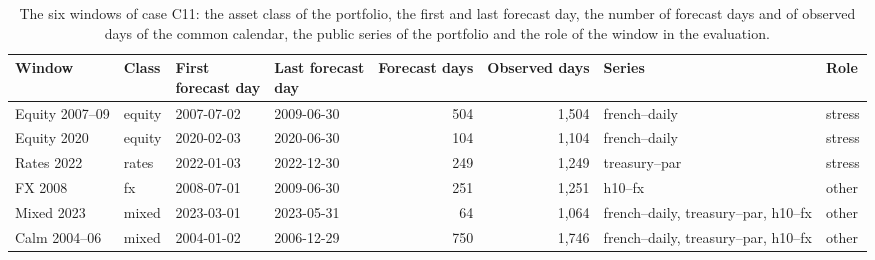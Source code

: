 \begin{table}[htbp]
\centering
\small
\caption{The six windows of case C11: the asset class of the portfolio, the first and last forecast day, the number of forecast days and of observed days of the common calendar, the public series of the portfolio and the role of the window in the evaluation.}
\label{tab:windows}
{\footnotesize\setlength{\tabcolsep}{4pt}
\begin{adjustbox}{max width=\textwidth}
\begin{tabular}{llllrrll}
\toprule
Window & Class & \makecell[bl]{First \\ forecast day} & \makecell[bl]{Last forecast \\ day} & Forecast days & Observed days & Series & Role \\
\midrule
Equity 2007--09 & equity & 2007-07-02 & 2009-06-30 & 504 & 1,504 & french--daily & stress \\
Equity 2020 & equity & 2020-02-03 & 2020-06-30 & 104 & 1,104 & french--daily & stress \\
Rates 2022 & rates & 2022-01-03 & 2022-12-30 & 249 & 1,249 & treasury--par & stress \\
FX 2008 & fx & 2008-07-01 & 2009-06-30 & 251 & 1,251 & h10--fx & other \\
Mixed 2023 & mixed & 2023-03-01 & 2023-05-31 & 64 & 1,064 & french--daily, treasury--par, h10--fx & other \\
Calm 2004--06 & mixed & 2004-01-02 & 2006-12-29 & 750 & 1,746 & french--daily, treasury--par, h10--fx & other \\
\bottomrule
\end{tabular}
\end{adjustbox}}
\end{table}
